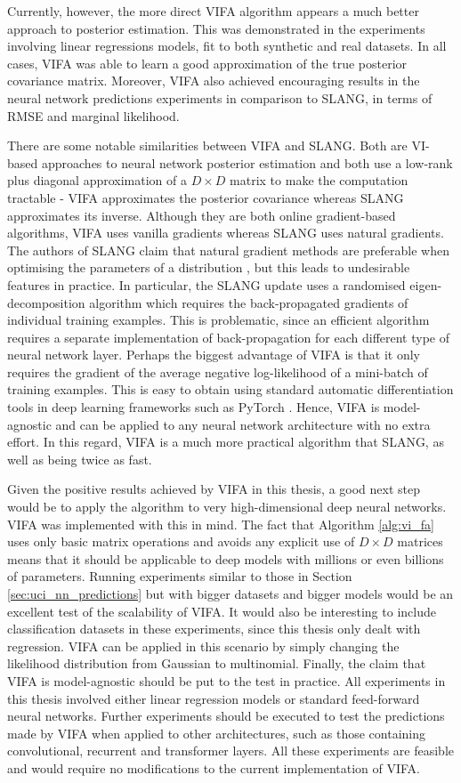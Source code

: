 \documentclass[msc,deptreport.inf]{infthesis} %
\begin{document}
Currently, however, the more direct VIFA algorithm appears a much better approach to posterior estimation. This was demonstrated in the experiments involving linear regressions models, fit to both synthetic and real datasets. In all cases, VIFA was able to learn a good approximation of the true posterior covariance matrix. Moreover, VIFA also achieved encouraging results in the neural network predictions experiments in comparison to SLANG, in terms of RMSE and marginal likelihood. 

There are some notable similarities between VIFA and SLANG. Both are VI-based approaches to neural network posterior estimation and both use a low-rank plus diagonal approximation of a $D \times D$ matrix to make the computation tractable - VIFA approximates the posterior covariance whereas SLANG approximates its inverse. Although they are both online gradient-based algorithms, VIFA uses vanilla gradients whereas SLANG uses natural gradients. The authors of SLANG claim that natural gradient methods are preferable when optimising the parameters of a distribution \cite{mishkin2018}, but this leads to undesirable features in practice. In particular, the SLANG update uses a randomised eigen-decomposition algorithm which requires the back-propagated gradients of individual training examples. This is problematic, since an efficient algorithm requires a separate implementation of back-propagation for each different type of neural network layer. Perhaps the biggest advantage of VIFA is that it only requires the gradient of the average negative log-likelihood of a mini-batch of training examples. This is easy to obtain using standard automatic differentiation tools in deep learning frameworks such as PyTorch \cite{paszke2019}. Hence, VIFA is model-agnostic and can be applied to any neural network architecture with no extra effort. In this regard, VIFA is a much more practical algorithm that SLANG, as well as being twice as fast.

Given the positive results achieved by VIFA in this thesis, a good next step would be to apply the algorithm to very high-dimensional deep neural networks. VIFA was implemented with this in mind. The fact that Algorithm \ref{alg:vi_fa} uses only basic matrix operations and avoids any explicit use of $D \times D$ matrices means that it should be applicable to deep models with millions or even billions of parameters. Running experiments similar to those in Section \ref{sec:uci_nn_predictions} but with bigger datasets and bigger models would be an excellent test of the scalability of VIFA. It would also be interesting to include classification datasets in these experiments, since this thesis only dealt with regression. VIFA can be applied in this scenario by simply changing the likelihood distribution from Gaussian to multinomial. Finally, the claim that VIFA is model-agnostic should be put to the test in practice. All experiments in this thesis involved either linear regression models or standard feed-forward neural networks. Further experiments should be executed to test the predictions made by VIFA when applied to other architectures, such as those containing convolutional, recurrent and transformer layers. All these experiments are feasible and would require no modifications to the current implementation of VIFA. 
\end{document}
